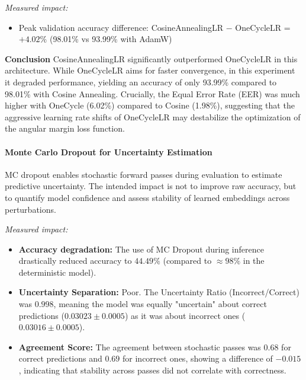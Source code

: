 \documentclass[12pt,a4paper]{article}
\begin{document}
\textit{Measured impact:}
\begin{itemize}
    \item Peak validation accuracy difference:
    CosineAnnealingLR $-$ OneCycleLR = 
    \newline $+4.02\%$ (98.01\% vs 93.99\% with AdamW)
\end{itemize}
\textbf{Conclusion}
CosineAnnealingLR significantly outperformed OneCycleLR in this architecture.
While OneCycleLR aims for faster convergence, in this experiment it degraded performance, yielding an accuracy of only 93.99\% compared to 98.01\% with Cosine Annealing.
Crucially, the Equal Error Rate (EER) was much higher with OneCycle (6.02\%) compared to Cosine (1.98\%), suggesting that the aggressive learning rate shifts of OneCycleLR may destabilize the optimization of the angular margin loss function.


\paragraph{Monte Carlo Dropout for Uncertainty Estimation}
MC dropout enables stochastic forward passes during evaluation to estimate predictive uncertainty. The intended impact is not to improve raw accuracy, but to quantify model confidence and assess stability of learned embeddings across perturbations.

\textit{Measured impact:}
\begin{itemize}
    \item \textbf{Accuracy degradation:} The use of MC Dropout during inference drastically reduced accuracy to $44.49\%$ (compared to $\approx 98\%$ in the deterministic model).
    \item \textbf{Uncertainty Separation:} Poor. The Uncertainty Ratio (Incorrect/Correct) was $0.998$, meaning the model was equally "uncertain" about correct predictions ($0.03023 \pm 0.0005$) as it was about incorrect ones ($0.03016 \pm 0.0005$).
    \item \textbf{Agreement Score:} The agreement between stochastic passes was $0.68$ for correct predictions and $0.69$ for incorrect ones, showing a difference of $-0.015$, indicating that stability across passes did not correlate with correctness.
\end{itemize}
\end{document}
